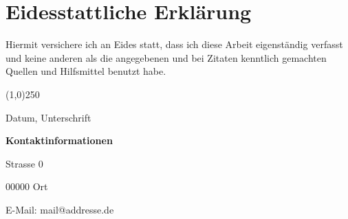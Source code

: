 \newpage
\section*{Eidesstattliche Erklärung}

Hiermit versichere ich an Eides statt, dass ich diese Arbeit eigenständig verfasst und keine anderen als die angegebenen und bei Zitaten kenntlich gemachten Quellen und Hilfsmittel benutzt habe.

\vspace{\baselineskip}
\vspace{\baselineskip}
\vspace{\baselineskip}

\line(1,0){250}

Datum, Unterschrift

\vfill

\textbf{Kontaktinformationen}

\bigskip

\theauthor

Strasse 0

00000 Ort

\medskip

E-Mail: mail@addresse.de

\vspace{\baselineskip}
\vspace{\baselineskip}
\vspace{\baselineskip}